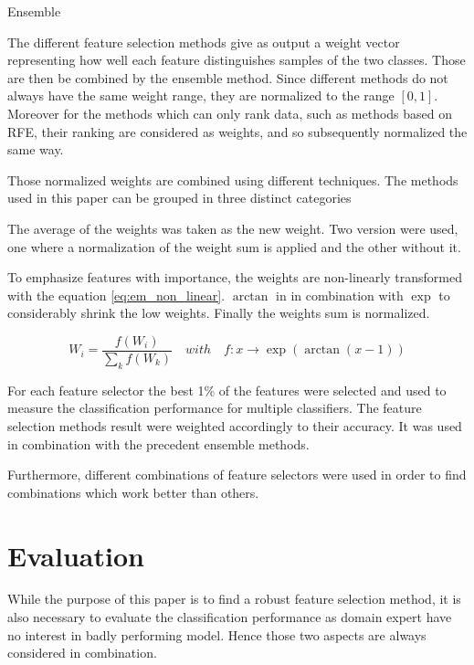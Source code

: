 \documentclass[twoside,11pt]{article}
\begin{document}
Ensemble

The different feature selection methods give as output a weight vector representing how well each feature distinguishes samples of the two classes. Those are then be combined by the ensemble method. Since different methods do not always have the same weight range, they are normalized to the range $[0,1]$. Moreover for the methods which can only rank data, such as methods based on RFE, their ranking are considered as weights, and so subsequently normalized the same way. 

Those normalized weights are combined using different techniques. The methods used in this paper can be grouped in three distinct categories 

\begin{description}[align=left]
\item [Linear aggregation :] The average of the weights was taken as the new weight. Two version were used, one where a normalization of the weight sum is applied and the other without it.
\item [Non-linear aggregation :] To emphasize features with importance, the weights are non-linearly transformed with the equation \ref{eq:em_non_linear}. $\arctan$ in in combination with $\exp$ to considerably shrink the low weights. Finally the weights sum is normalized.

\begin{equation}
  \label{eq:em_non_linear}
  W_i = \frac{f \left( W_i \right)}{\sum_k f \left( W_k \right)} \quad with \quad f : x \rightarrow \exp( \arctan(x - 1) )
\end{equation}

\item [Performance related aggregation :] For each feature selector the best 1\% of the features were selected and used to measure the classification performance for multiple classifiers. The feature selection methods result were weighted accordingly to their accuracy. It was used in combination with the precedent ensemble methods.
\end{description}

Furthermore, different combinations of feature selectors were used in order to find combinations which work better than others.

\section{Evaluation}

While the purpose of this paper is to find a robust feature selection method, it is also necessary to evaluate the classification performance as domain expert have no interest in badly performing model. Hence those two aspects are always considered in combination.
\end{document}
